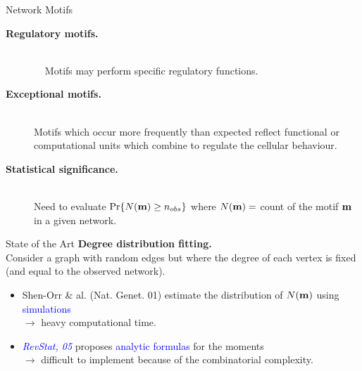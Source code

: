 \documentclass[pdf,mia,noFooter,slideColor,colorBG]{prosper}
\newcommand{\emphase}[1]{{\textcolor{blue}{{#1}}}}
\newcommand{\publi}[1]{{\textcolor{blue}{{\sl \normalsize #1}}}}
\renewcommand{\paragraph}[1]{{\large \bf  #1}}
\begin{document}
\begin{slide}{Network Motifs}
\begin{description}
\item[\paragraph{Regulatory motifs.}] ~\\
  $\begin{array}{ccc}
  \end{array}$
  Motifs may perform specific regulatory functions.
\item[\paragraph{Exceptional motifs.}] ~\\
  Motifs which occur more frequently than expected reflect functional
  or computational units which combine to regulate the cellular
  behaviour. \\
\item[\paragraph{Statistical significance.}] ~\\
  Need to evaluate 
  $
  \Pr\{N({\bf m}) \geq n_{obs}\}
  $
  where $N({\bf m}) = $ count of the motif ${\bf m}$ in a given
  network.
\end{description}
\end{slide}

\begin{slide}{State of the Art}
  \paragraph{Degree distribution fitting.} ~\\
  Consider a graph with random edges but where the degree of each
  vertex is fixed (and equal to the observed network). \\
  \begin{itemize}
  \item Shen-Orr \& al. (Nat. Genet. 01) estimate the distribution
    of $N({\bf m})$ using \emphase{simulations} \\
    $\longrightarrow$ heavy computational time.
  \item \publi{RevStat, 05} proposes \emphase{analytic formulas} for
    the moments \\
    $\longrightarrow$ difficult to implement because of the
    combinatorial complexity.
  \end{itemize}
\end{slide}
\end{document}
